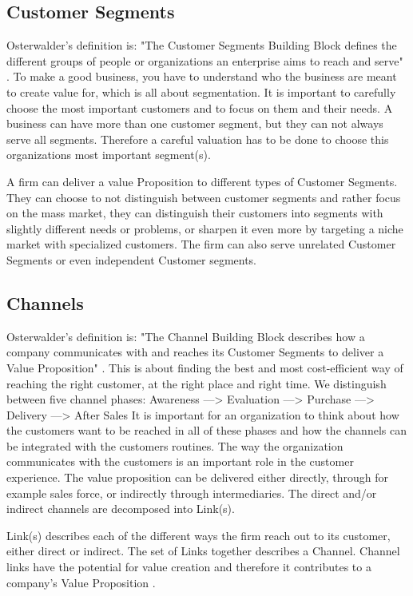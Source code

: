 \subsection{Customer Segments}
Osterwalder's definition is: "The Customer Segments Building Block defines the different groups of people or organizations an enterprise aims to reach and serve" \cite{osterwalder}. To make a good business, you have to understand who the business are meant to create value for, which is all about segmentation. It is important to carefully choose the most important customers and to focus on them and their needs. A business can have more than one customer segment, but they can not always serve all segments. Therefore a careful valuation has to be done to choose this organizations most important segment(s).  

A firm can deliver a value Proposition to different types of Customer Segments. They can choose to not distinguish between customer segments and rather focus on the mass market, they can distinguish their customers into segments with slightly different needs or problems, or sharpen it even more by targeting a niche market with specialized customers. The firm can also serve unrelated Customer Segments or even independent Customer segments. 

\subsection{Channels}
Osterwalder's definition is: "The Channel Building Block describes how a company communicates with and reaches its Customer Segments to deliver a Value Proposition" \cite{osterwalder}. This is about finding the best and most cost-efficient way of reaching the right customer, at the right place and right time. We distinguish between five channel phases: 
Awareness ---> Evaluation ---> Purchase ---> Delivery ---> After Sales
It is important for an organization to think about how the customers want to be reached in all of these phases and how the channels can be integrated with the customers routines. The way the organization communicates with the customers is an important role in the customer experience. The value proposition can be delivered either directly, through for example sales force, or indirectly through intermediaries. The direct and/or indirect channels are decomposed into Link(s).

Link(s) describes each of the different ways the firm reach out to its customer, either direct or indirect. The set of Links together describes a Channel. Channel links have the potential for value creation and therefore it contributes to a company's Value Proposition \cite{osterwalderthesis}.

